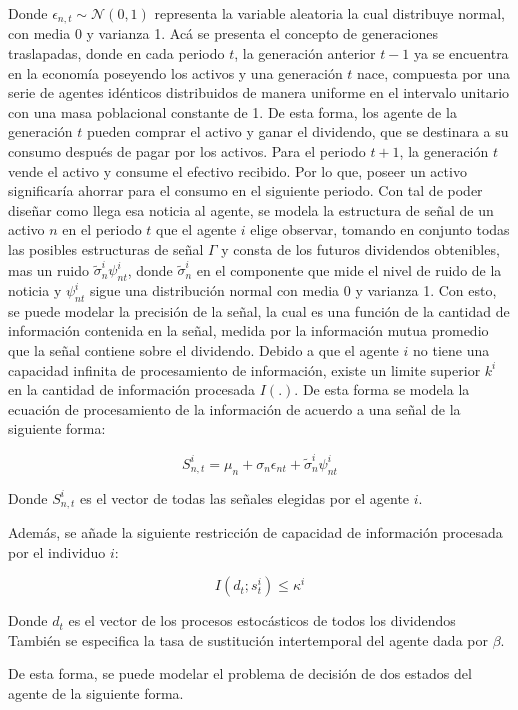Donde $\epsilon_{n,t} \sim \mathcal{N}(0, 1)$ representa la variable aleatoria la cual distribuye normal, con media 0 y varianza 1. Acá se presenta el concepto de generaciones traslapadas, donde en cada periodo $t$, la generación anterior $t-1$ ya se encuentra en la economía poseyendo los activos y una generación $t$ nace, compuesta por una serie de agentes idénticos distribuidos de manera uniforme en el intervalo unitario con una masa poblacional constante de 1. De esta forma, los agente de la generación $t$ pueden comprar el activo y ganar el dividendo, que se destinara a su consumo después de pagar por los activos. Para el periodo $t+1$, la generación $t$ vende el activo y consume el efectivo recibido. Por lo que, poseer un activo significaría ahorrar para el consumo en el siguiente periodo. Con tal de poder diseñar como llega esa noticia al agente, se modela la estructura de señal de un activo $n$ en el periodo $t$ que el agente $i$ elige observar, tomando en conjunto todas las posibles estructuras de señal $\Gamma$ y consta de los futuros dividendos obtenibles, mas un ruido $ \tilde\sigma^{i}_n \psi^{i}_{nt}$, donde $\tilde\sigma^{i}_n$ en el componente que mide el nivel de ruido de la noticia y $\psi^{i}_{nt}$ sigue una distribución normal con media 0 y varianza 1. Con esto, se puede modelar la precisión de la señal, la cual es una función de la cantidad de información contenida en la señal, medida por la información mutua promedio que la señal contiene sobre el dividendo. Debido a que el agente $i$ no tiene una capacidad infinita de procesamiento de información, existe un limite superior $k^{i}$ en la cantidad de información procesada $I(.)$. De esta forma se modela la ecuación de procesamiento de la información de acuerdo a una señal de la siguiente forma:

$$S^{i}_{n,t} = \mu_n + \sigma_n\epsilon_{nt} + \tilde\sigma^{i}_n \psi^{i}_{nt}$$

Donde $S^{i}_{n,t}$ es el vector de todas las señales elegidas por el agente $i$.

Además, se añade la siguiente restricción de capacidad de información procesada por el individuo $i$:

$$I (d_t; s^i_t) \leq \kappa^i $$

Donde $d_t$ es el vector de los procesos estocásticos de todos los dividendos
También se especifica la tasa de sustitución intertemporal del agente dada por $\beta$.

De esta forma, se puede modelar el problema de decisión de dos estados del agente de la siguiente forma.

